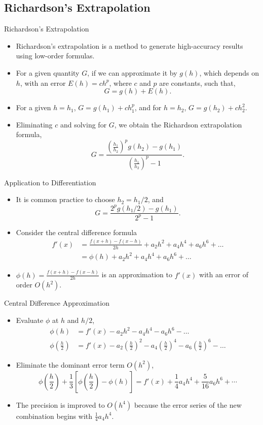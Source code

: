 \documentclass{beamer}
\begin{document}
\subsection[Richardson's Extrapolation]{Richardson's Extrapolation}
\begin{frame}{Richardson's Extrapolation}
\begin{itemize}
\item Richardson's extrapolation is a method to generate \alert{high-accuracy results} using \alert{low-order formulas}. 
\item For a given quantity $G$, if we can approximate it by $g(h)$, which depends on $h$, with an error $E(h)=ch^p$, where $c$ and $p$ are constants, such that, 
\[
G=g(h)+E(h).
\]
\item For a given  $h=h_1$,  
$G=g(h_1)+ch_1^p$, and for $h=h_2$, $G=g(h_2)+ch_2^2$.
\item Eliminating $c$ and solving for $G$, we obtain the \alert{Richardson extrapolation formula},
\[
G=\frac{\left(\frac{h_1}{h_2}\right)^p g(h_2)-g(h_1)}{\left(\frac{h_1}{h_2}\right)^p-1}.
\]

 
\end{itemize}
\end{frame}
\begin{frame}{Application to Differentiation}
\begin{itemize}
\item It is common practice to choose $h_2=h_1/2$, and
\[
G=\frac{2^p g(h_1/2)-g(h_1)}{2^p-1}.
\]
\item Consider the central difference formula
\begin{align*}
f'(x)&=\frac{f(x+h)-f(x-h)}{2h}+a_2h^2+a_4h^4+a_6h^6+\ldots\\
&=\phi(h)+a_2h^2+a_4h^4+a_6h^6+\ldots
\end{align*}
\item $\phi(h)=\frac{f(x+h)-f(x-h)}{2h}$ is an approximation to $f'(x)$ with an error of order $O(h^2)$.
\end{itemize}
\end{frame}
\begin{frame}{Central Difference Approximation}
\begin{itemize}
\item Evaluate $\phi$ at $h$ and $h/2$,
\begin{align*}
\phi(h)&=f'(x)-a_2h^2-a_4h^4-a_6h^6-\ldots\\
\phi\left(\frac{h}{2}\right)&=f'(x)-a_2\left(\frac{h}{2}\right)^2-a_4\left(\frac{h}{2}\right)^4-a_6\left(\frac{h}{2}\right)^6-\ldots
\end{align*}
\item Eliminate the dominant error term $O(h^2)$, 
\[
\phi\left(\frac{h}{2}\right)+\frac{1}{3}\left[\phi\left(\frac{h}{2}\right)-\phi(h)\right]=f'(x)+\frac{1}{4}a_4h^4+\frac{5}{16}a_6h^6+\cdots
\]
\item The precision is improved to $O(h^4)$ because the error series of the new combination begins with $\frac{1}{4} a_4h^4$.

 \end{itemize}
\end{frame}
\end{document}
